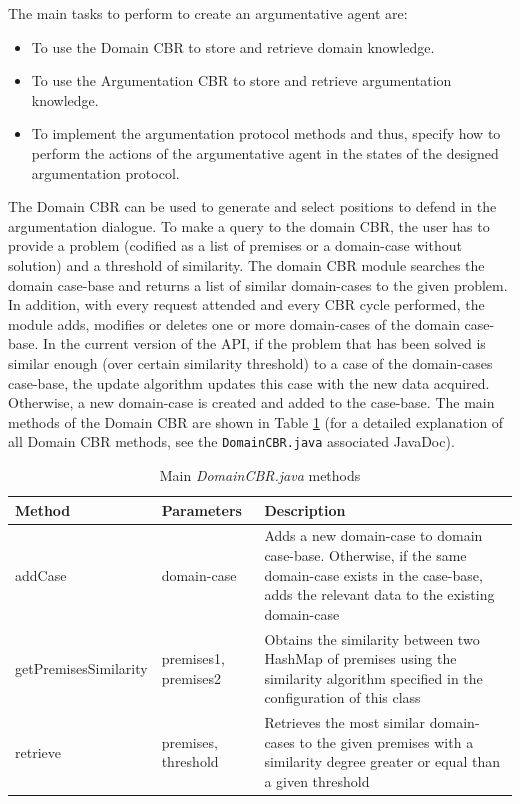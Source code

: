 The main tasks to perform to create an argumentative agent are:
\begin{itemize}
 \item To use the Domain CBR to store and retrieve domain knowledge.
 \item To use the Argumentation CBR to store and retrieve argumentation knowledge.
 \item To implement the argumentation protocol methods and thus, specify how to perform the actions of the argumentative agent in the states of the designed argumentation protocol.
\end{itemize}

The Domain CBR can be used to generate and select positions to defend in the argumentation dialogue. To make a query to the domain CBR, the user has to provide a problem (codified as a list of premises or a domain-case without solution) and a threshold of similarity. The domain CBR module searches the domain case-base and returns a list of similar domain-cases to the given problem. In addition, with every request attended and every CBR cycle performed, the module adds, modifies or deletes one or more domain-cases of the domain case-base. In the current version of the API, if the problem that has been solved is similar enough (over certain similarity threshold) to a case of the domain-cases case-base, the update algorithm updates this case with the new data acquired. Otherwise, a new domain-case is created and added to the case-base.
The main methods of the Domain CBR are shown in Table \ref{tab:DomainCBRMethods} (for a detailed explanation of all Domain CBR methods, see the \lstinline|DomainCBR.java| associated JavaDoc).
\begin{table}[h!t]
\begin{tabular}{|l|l|p{6cm}|}
\hline
\textbf{Method} & \textbf{Parameters} & \textbf{Description} \\ \hline
addCase & domain-case & Adds a new domain-case to domain case-base. Otherwise, if the same domain-case exists in the case-base, adds the relevant data to the existing domain-case \\ \hline
getPremisesSimilarity & premises1, premises2 & Obtains the similarity between two HashMap of premises using the similarity algorithm specified in the configuration of this class \\ \hline
retrieve & premises, threshold & Retrieves the most similar domain-cases to the given premises with a similarity degree greater or equal than a given threshold \\ \hline
\end{tabular}
\caption{Main \textit{DomainCBR.java} methods}
\label{tab:DomainCBRMethods}
\end{table}

